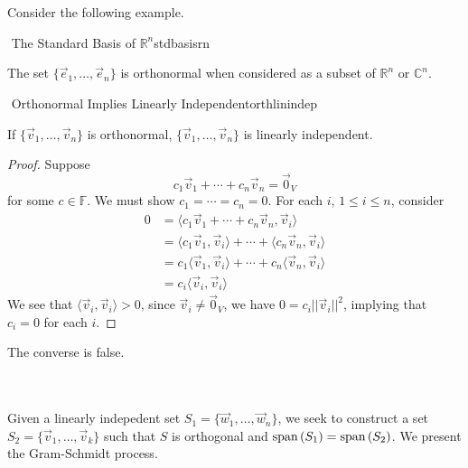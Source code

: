         \vphantom
        \\
        \\
        Consider the following example.
        \begin{example}{\Difficulty\,\,The Standard Basis of \(\mathbb{R}^n\)}{stdbasisrn}

            The set \(\{\vec{e}_1,\ldots,\vec{e}_n\}\) is orthonormal when considered as a subset of \(\mathbb{R}^n\) or \(\mathbb{C}^n\).
            
        \end{example}
        \begin{theorem}{\Stop\,\,Orthonormal Implies Linearly Independent}{orthlinindep}
            
            If \(\{\vec{v}_1,\ldots,\vec{v}_n\}\) is orthonormal, \(\{\vec{v}_1,\ldots,\vec{v}_n\}\) is linearly independent.
            \begin{proof}
                Suppose
                \begin{equation*}
                    c_1\vec{v}_1+\cdots+c_n\vec{v}_n=\vec{0}_V
                \end{equation*}
                for some \(c\in\mathbb{F}\). We must show \(c_1=\cdots=c_n=0\). For each \(i\), \(1\leq i\leq n\), consider 
                \begin{align*}
                    0&=\langle c_1\vec{v}_1+\cdots+c_n\vec{v}_n,\vec{v}_i \rangle \\
                    &=\langle c_1\vec{v}_1,\vec{v}_i\rangle+\cdots+\langle c_n\vec{v}_n,\vec{v}_i\rangle \\
                    &=c_1\langle \vec{v}_1,\vec{v}_i\rangle+\cdots+c_n\langle \vec{v}_n,\vec{v}_i\rangle \\
                    &=c_i\langle \vec{v}_i,\vec{v}_i\rangle
                \end{align*}
                We see that \(\langle\vec{v}_i,\vec{v}_i\rangle>0\), since \(\vec{v}_i\neq\vec{0}_V\), we have \(0=c_i||\vec{v}_i||^2\), implying that \(c_i=0\) for each \(i\).
            \end{proof}
            The converse is false.

        \end{theorem}
        \pagebreak
        \vphantom
        \\
        \\
        Given a linearly indepedent set \(S_1=\{\vec{w}_1,\ldots,\vec{w}_n\}\), we seek to construct a set \(S_2=\{\vec{v}_1,\ldots,\vec{v}_k\}\) such that \(S\) is orthogonal and \(\text{span\,}(S_1)=\text{span\,}(S_2)\). We present the Gram-Schmidt process.
